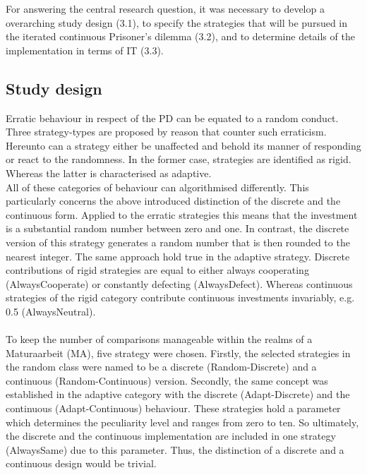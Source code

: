 \documentclass{article}
\begin{document}
For answering the central research question, it was necessary to develop a overarching study design (3.1), to specify the strategies that will be pursued in the iterated continuous Prisoner’s dilemma (3.2), and to determine details of the implementation in terms of IT (3.3).

\subsection{Study design}

Erratic behaviour in respect of the PD can be equated to a random conduct.
Three strategy-types are proposed by reason that counter such erraticism.
Hereunto can a strategy either be unaffected and behold its manner of responding or react to the randomness.
In the former case, strategies are identified as rigid.
Whereas the latter is characterised as adaptive.\\

All of these categories of behaviour can algorithmised differently.
This particularly concerns the above introduced distinction of the discrete and the continuous form.
Applied to the erratic strategies this means that the investment is a substantial random number between zero and one.
In contrast, the discrete version of this strategy generates a random number that is then rounded to the nearest integer.
The same approach hold true in the adaptive strategy.
Discrete contributions of rigid strategies are equal to either always cooperating (AlwaysCooperate) or constantly defecting (AlwaysDefect).
Whereas continuous strategies of the rigid category contribute continuous investments invariably, e.g. 0.5 (AlwaysNeutral).\\

\\

To keep the number of comparisons manageable within the realms of a Maturaarbeit (MA), five strategy were chosen.
Firstly, the selected strategies in the random class were named to be a discrete (Random-Discrete) and a continuous (Random-Continuous) version.
Secondly, the same concept was established in the adaptive category with the discrete (Adapt-Discrete) and the continuous (Adapt-Continuous) behaviour.
These strategies hold a parameter which determines the peculiarity level and ranges from zero to ten.
So ultimately, the discrete and the continuous implementation are included in one strategy (AlwaysSame) due to this parameter.
Thus, the distinction of a discrete and a continuous design would be trivial.\\
\end{document}
